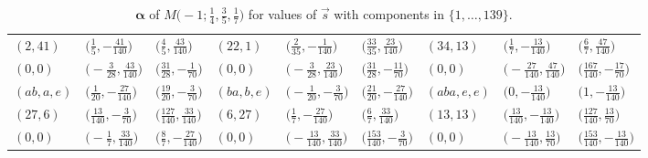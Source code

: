 \documentclass[10pt,a4paper]{amsart}
\theoremstyle{definition}
\numberwithin{equation}{section}
\begin{document}
\begin{landscape}
\begin{table}[th]
\begin{tabular}{|lll|lll|lll|}
\\
$(2, 41)$ & $\bigl(\frac{1}{5}, -\frac{41}{140}\bigr)$ & $\bigl(\frac{4}{5}, \frac{43}{140}\bigr)$ & $(22, 1)$ & $\bigl(\frac{2}{35}, -\frac{1}{140}\bigr)$ & $\bigl(\frac{33}{35}, \frac{23}{140}\bigr)$ & $(34, 13)$ & $\bigl(\frac{1}{7}, -\frac{13}{140}\bigr)$ & $\bigl(\frac{6}{7}, \frac{47}{140}\bigr)$
\\
$(0, 0)$ & $\bigl(-\frac{3}{28}, \frac{43}{140}\bigr)$ & $\bigl(\frac{31}{28}, -\frac{1}{70}\bigr)$ & $(0, 0)$ & $\bigl(-\frac{3}{28}, \frac{23}{140}\bigr)$ & $\bigl(\frac{31}{28}, -\frac{11}{70}\bigr)$ & $(0, 0)$ & $\bigl(-\frac{27}{140}, \frac{47}{140}\bigr)$ & $\bigl(\frac{167}{140}, -\frac{17}{70}\bigr)$
\\\hline
$(ab, a, e)$ & $\bigl(\frac{1}{20}, -\frac{27}{140}\bigr)$ & $\bigl(\frac{19}{20}, -\frac{3}{70}\bigr)$ & $(ba, b, e)$ & $\bigl(-\frac{1}{20}, -\frac{3}{70}\bigr)$ & $\bigl(\frac{21}{20}, -\frac{27}{140}\bigr)$ & $(aba, e, e)$ & $\bigl(0, -\frac{13}{140}\bigr)$ & $\bigl(1, -\frac{13}{140}\bigr)$
\\
$(27, 6)$ & $\bigl(\frac{13}{140}, -\frac{3}{70}\bigr)$ & $\bigl(\frac{127}{140}, \frac{33}{140}\bigr)$ & $(6, 27)$ & $\bigl(\frac{1}{7}, -\frac{27}{140}\bigr)$ & $\bigl(\frac{6}{7}, \frac{33}{140}\bigr)$ & $(13, 13)$ & $\bigl(\frac{13}{140}, -\frac{13}{140}\bigr)$ & $\bigl(\frac{127}{140}, \frac{13}{70}\bigr)$
\\
$(0, 0)$ & $\bigl(-\frac{1}{7}, \frac{33}{140}\bigr)$ & $\bigl(\frac{8}{7}, -\frac{27}{140}\bigr)$ & $(0, 0)$ & $\bigl(-\frac{13}{140}, \frac{33}{140}\bigr)$ & $\bigl(\frac{153}{140}, -\frac{3}{70}\bigr)$ & $(0, 0)$ & $\bigl(-\frac{13}{140}, \frac{13}{70}\bigr)$ & $\bigl(\frac{153}{140}, -\frac{13}{140}\bigr)$
\\\hline
\end{tabular}
\caption{$\boldsymbol{\alpha}$ of $M\bigl( -1;\frac{1}{4},\frac{3}{5}, \frac{1}{7} \bigr)$ for values of $\vec{s}$ with components in $\{1,\dots,139\}$.} \label{tab:SstarBriesk}
 \end{table}


\end{landscape}
\end{document}
